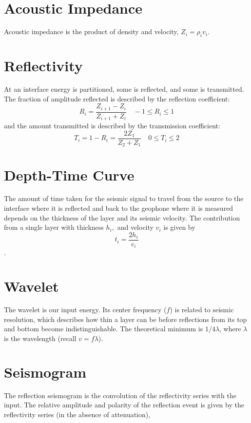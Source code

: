 \documentclass{article}[11pt,oneside]
\begin{document}
\section*{Acoustic Impedance}

Acoustic impedance is the product of density and velocity, $Z_i = \rho_i v_i$.

\section*{Reflectivity}
At an interface energy is partitioned, some is reflected, and some is transmitted. The fraction of amplitude reflected is described by the reflection coefficient:
$$R_i = \frac{Z_{i+1} - Z_i}{Z_{i+1}+Z_i} \quad -1 \leq R_i \leq 1$$
and the amount transmitted is described by the transmission coefficient:
$$T_i = 1-R_i = \frac{2Z_1}{Z_2+Z_1} \quad 0 \leq T_i \leq 2$$


\section*{Depth-Time Curve}
The amount of time taken for the seismic signal to travel from the source to the interface where it is reflected and back to the geophone where it is measured depends on the thickness of the layer and its seismic velocity. The contribution from a single layer with thickness $h_i,$ and velocity $v_i$ is given by
$$t_i = \frac{2h_i}{v_i}$$.


\section*{Wavelet}
The wavelet is our input energy. Its center frequency ($f$) is related to seismic resolution, which describes how thin a layer can be before reflections from its top and bottom become indistinguishable. The theoretical minimum is $1/4 \lambda$, where $\lambda$ is the wavelength (recall $v = f\lambda$).

\section*{Seismogram}
The reflection seismogram is the convolution of the reflectivity series with the input. The relative amplitude and polarity of the reflection event is given by the reflectivity series (in the absence of attenuation),
\end{document}
